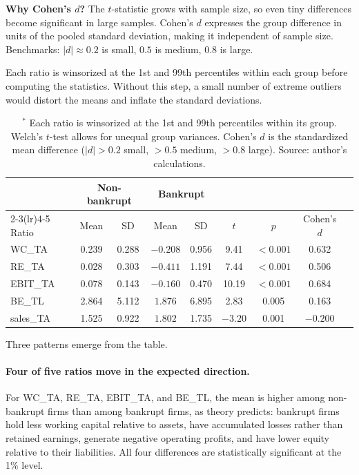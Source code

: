 \documentclass[12pt,a4paper]{article}
\begin{document}
\textbf{Why Cohen's $d$?} The $t$-statistic grows with sample size, so
even tiny differences become significant in large samples. Cohen's $d$
\citep{cohen1988} expresses the group difference in units of the pooled
standard deviation, making it independent of sample size. Benchmarks:
$|d| \approx 0.2$ is small, $0.5$ is medium, $0.8$ is large.

Each ratio is winsorized at the 1st and 99th percentiles within each group
before computing the statistics. Without this step, a small number of extreme
outliers would distort the means and inflate the standard deviations.

\begin{table}[ht]
\centering
\caption{Altman ratio means by bankruptcy status at H1.$^{*}$}
\label{tab:descriptives}
\small
\begin{tabular}{lcccccccc}
\toprule
 & \multicolumn{2}{c}{Non-bankrupt} & \multicolumn{2}{c}{Bankrupt} & & & \\
\cmidrule(lr){2-3}\cmidrule(lr){4-5}
Ratio & Mean & SD & Mean & SD & $t$ & $p$ & Cohen's $d$ \\
\midrule
WC\_TA    & 0.239 & 0.288 & $-0.208$ & 0.956 &  9.41 & $<0.001$ &  0.632 \\
RE\_TA    & 0.028 & 0.303 & $-0.411$ & 1.191 &  7.44 & $<0.001$ &  0.506 \\
EBIT\_TA  & 0.078 & 0.143 & $-0.160$ & 0.470 & 10.19 & $<0.001$ &  0.684 \\
BE\_TL    & 2.864 & 5.112 &  $1.876$ & 6.895 &  2.83 &    0.005 &  0.163 \\
sales\_TA & 1.525 & 0.922 &  $1.802$ & 1.735 & $-3.20$ &  0.001 & $-0.200$ \\
\bottomrule
\end{tabular}
\caption*{\footnotesize Group sizes (after dropping NaN, before winsorization):
non-bankrupt $n=5{,}498$, bankrupt $n=409$.}
\caption*{\footnotesize $^{*}$ Each ratio is winsorized at the 1st and 99th percentiles within its group. Welch's $t$-test allows for unequal group variances. Cohen's $d$ is the standardized mean difference ($|d|>0.2$ small, $>0.5$ medium, $>0.8$ large). Source: author's calculations.}
\end{table}

Three patterns emerge from the table.

\paragraph{Four of five ratios move in the expected direction.} For WC\_TA,
RE\_TA, EBIT\_TA, and BE\_TL, the mean is higher among non-bankrupt firms
than among bankrupt firms, as theory predicts: bankrupt firms hold less
working capital relative to assets, have accumulated losses rather than
retained earnings, generate negative operating profits, and have lower equity
relative to their liabilities. All four differences are statistically
significant at the 1\% level.
\end{document}
